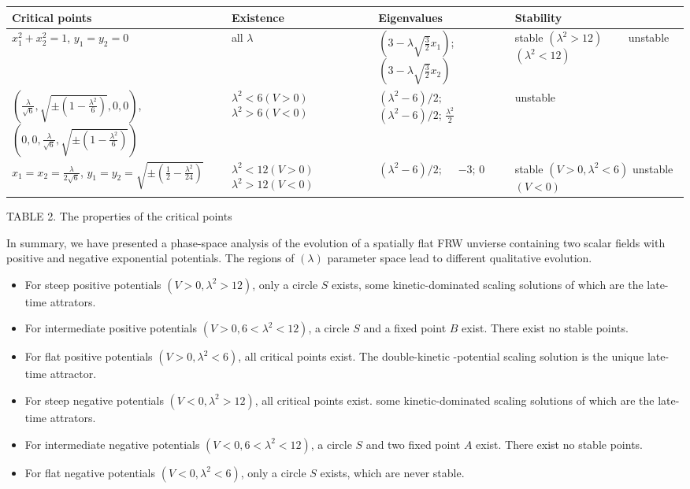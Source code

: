 \documentclass[a4paper,12pt]{article}
\newcommand{\vs}[1]{\vspace{#1 mm}}
\begin{document}
\vs{4}
\begin{tabular}{||p{4cm}|p{2.8cm}|p{2.5cm}|p{4cm}||} \hline \hline
Critical points & Existence & Eigenvalues & Stability \\ \hline
$x_1^2+x_2^2=1$, $y_1=y_2=0$ & all $\lambda$ & $(3-\lambda
\sqrt{\frac{3}{2}}x_1)$; $(3-\lambda \sqrt{\frac{3}{2}}x_2)$ &
stable $(\lambda ^2>12)\qquad $ unstable $(\lambda ^2<12)$ \\
\hline $(\frac{\lambda}{\sqrt{6}},\sqrt{\pm (1-\frac{\lambda
^2}{6})},0,0)$, $(0,0,\frac{\lambda}{\sqrt{6}},\sqrt{\pm
(1-\frac{\lambda ^2}{6})})$ & $\lambda ^2<6 (V>0)$ $\lambda ^2>6
(V<0)$ & $(\lambda ^2-6)/2;\quad $ $(\lambda ^2-6)/2$;
$\frac{\lambda ^2}{2}$ & unstable \\ \hline
$x_1=x_2=\frac{\lambda}{2\sqrt{6}}$, $y_1=y_2=\sqrt{\pm
(\frac{1}{2}-\frac{\lambda ^2}{24})}$ & $\lambda ^2<12 (V>0)$
$\lambda ^2>12 (V<0)$ & $(\lambda ^2-6)/2;\quad $ $-3$; 0 & stable
$(V>0,\lambda ^2<6)$ unstable $(V<0)$ \\ \hline \hline
\end{tabular}
\begin{center}
TABLE 2. The properties of the critical points
\end{center}




In summary, we have presented a phase-space analysis of the
evolution of a spatially flat FRW unvierse containing two scalar
fields with positive and negative exponential potentials. The
regions of $(\lambda )$ parameter space lead to different
qualitative evolution.
\begin{itemize}
\item For steep positive potentials $(V>0, \lambda ^2>12)$,
 only a circle $S$ exists, some kinetic-dominated
 scaling solutions of which are the late-time attrators.
\item For intermediate positive potentials $(V>0, 6<\lambda ^2<12)$,
 a circle $S$ and a fixed point $B$ exist. There exist no stable
 points.
\item For flat positive potentials $(V>0, \lambda ^2<6)$, all
 critical points exist. The double-kinetic -potential scaling
 solution is the unique late-time attractor.
\item For steep
 negative potentials $(V<0, \lambda ^2>12)$, all critical points
 exist. some kinetic-dominated scaling solutions of which are the
 late-time attrators.
\item For intermediate negative potentials $(V<0, 6<\lambda ^2<12)$,
 a circle $S$ and two fixed point $A$ exist.
 There exist no stable points.
\item For flat negative potentials $(V<0, \lambda ^2<6)$,
 only a circle $S$ exists, which are never stable.
\end{itemize}
\end{document}
